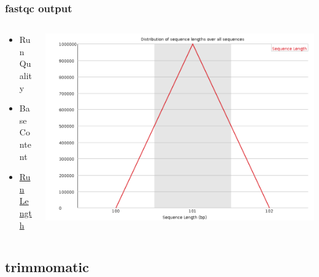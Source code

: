 \documentclass[14pt,handout]{beamer}
\begin{document}
\begin{frame}
\frametitle{fastqc output}
\begin{columns}
	\begin{column}{0.35\textwidth}
		\begin{itemize}
			\item<+-> Run Quality
			\item<+-> Base Content
			\item<+-> \underline{Run Length}
		\end{itemize}
		\end{column}
	\begin{column}{0.65\textwidth}
		\begin{center}
     		\includegraphics[width=1\textwidth]{images_20171012_run_length.png}
     	\end{center}
	\end{column}
\end{columns}
\end{frame}

\subsection{trimmomatic}
\end{document}
